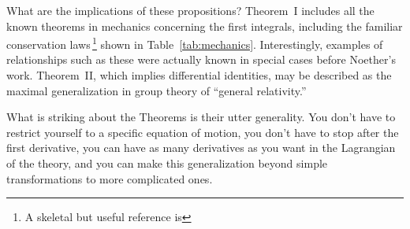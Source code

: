 \documentclass[twoside,symmetric]{tufte-handout}
\newcommand{\B}{\rule[-1.2ex]{0pt}{0pt}} %
\begin{document}
What are the implications of these propositions? Theorem~I includes all the known theorems in mechanics concerning the first integrals, including the familiar conservation laws$\,$\footnote[][0pt]{A skeletal but useful reference is } shown in Table~\ref{tab:mechanics}. Interestingly, examples of relationships such as these were actually known in special cases before Noether's work. Theorem~II, which implies differential identities, may be described as the maximal generalization in group theory of ``general relativity.''
{\begingroup
 \setlength\tabcolsep{1.66mm}
\endgroup}
What is striking about the Theorems is their utter generality. You don't have to restrict yourself to a specific equation of motion, you don't have to stop after the first derivative, you can have as many derivatives as you want in the Lagrangian of the theory, and  you can make this generalization beyond simple transformations to more complicated ones.
\end{document}
